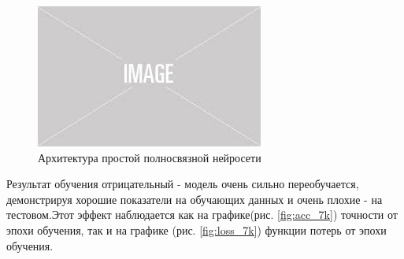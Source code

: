 \documentclass{article}
\begin{document}
\begin{figure}[!h]
\includegraphics[width=\linewidth]{imgs/placeholder.jpeg}
\caption{Архитектура простой полносвязной нейросети}
\label{img:model1}
\end{figure}

Результат обучения отрицательный - модель очень сильно переобучается, демонстрируя хорошие показатели на обучающих данных и очень плохие - на тестовом.Этот эффект наблюдается как на графике(рис. \ref{fig:acc_7k}) точности от эпохи обучения, так и на графике (рис. \ref{fig:loss_7k}) функции потерь от эпохи обучения.
\end{document}
